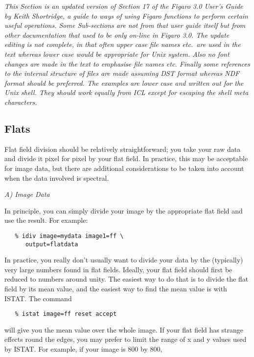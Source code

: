 {\it This Section is an updated version of Section 17 of the Figaro 3.0
User's Guide by Keith Shortridge, a guide to ways of using Figaro
functions to perform certain useful operations. Some Sub-sections are
not from that user guide itself but from other documentation that used
to be only on-line in Figaro 3.0. The update editing is not complete, in
that often upper case file names etc.\ are used in the text whereas
lower case would be appropriate for Unix system. Also no font changes
are made in the text to emphasise file names etc. Finally some
references to the internal structure of files are made assuming DST
format whereas NDF format should be preferred.  The examples are lower
case and written out for the Unix shell. They should work equally from
ICL except for escaping the shell meta characters.}


\subsection{Flats}

Flat field division should be relatively straightforward; you take
your raw data and divide it pixel for pixel by your flat field.  In
practice, this may be acceptable for image data, but there are additional
considerations to be  taken into account when the data involved is spectral.


\goodbreak
\vspace{12pt}
{\it A) Image Data}

In principle, you can simply divide your image by the appropriate
flat field and use the result.  For example:

\begin{verbatim}
   % idiv image=mydata image1=ff \
      output=flatdata
\end{verbatim}

In practice, you really don't usually want to divide your data by
the (typically) very large numbers found in flat fields.  Ideally, your
flat field should first be reduced to numbers around unity.  The easiest
way to do that is to divide the flat field by its mean value, and the
easiest way to find the mean value is with ISTAT.  The command

\begin{verbatim}
   % istat image=ff reset accept
\end{verbatim}

will give you the mean value over the whole image.  If your flat field has
strange effects round the edges, you may prefer to limit the range of
x and y values used by ISTAT.  For example, if your image is 800 by 800,

